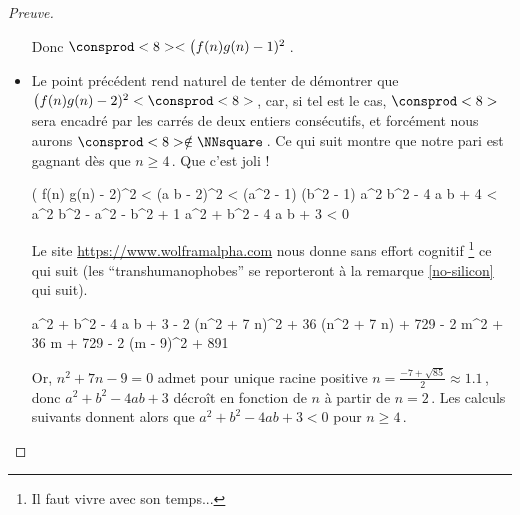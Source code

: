 \begin{proof}[Preuve]
\begin{itemize}
        \medskip
        
        \noindent
        Donc $\consprod<8> < \big( f(n) g(n) - 1)^2$\,.


		\item Le point précédent rend naturel de tenter de démontrer que 
		$\big( f(n) g(n) - 2)^2 < \consprod<8>$\,, car, si tel est le cas, 
		$\consprod<8>$ sera encadré par les carrés de deux entiers consécutifs, et forcément nous aurons $\consprod<8> \notin \NNsquare$\,. 
		Ce qui suit montre que notre pari est gagnant dès que $n \geq 4$\,. Que c'est joli !

        \medskip
        \noindent\kern-6pt%
        \begin{stepcalc}[style = ar*, ope={\iff}]
        	\big( f(n) g(n) - 2)^2 < \consprod<8>
        	(a b - 2)^2 < (a^2 - 1) (b^2 - 1)
        \explnext{}
        	a^2 b^2 - 4 a b + 4 < a^2 b^2 - a^2 - b^2 + 1
        \explnext{}
        	a^2 + b^2 - 4 a b + 3 < 0
        \end{stepcalc}

        \medskip
        \noindent
        Le site \url{https://www.wolframalpha.com} nous donne sans effort cognitif
        \footnote{
        	Il faut vivre avec son temps...
        }
        ce qui suit (les \enquote{transhumanophobes} se reporteront à la remarque \ref{no-silicon} qui suit).

        \medskip
        \noindent\kern-6pt%
        \begin{stepcalc}[style = ar*, ope={=}]
        	a^2 + b^2 - 4 a b + 3
        \explnext{}
        	- 2 (n^2 + 7 n)^2 + 36 (n^2 + 7 n) + 729
        	- 2 m^2 + 36 m + 729
        \explnext{}
        	- 2 (m - 9)^2 + 891
        \end{stepcalc}
        
        \medskip
        
        \noindent
        Or, $n^2 + 7 n - 9 = 0$ admet pour unique racine positive $n = \frac{- 7 + \sqrt{85}}{2} \approx \num{1.1}$\,,
        donc $a^2 + b^2 - 4 a b + 3$ décroît en fonction de $n$ à partir de $n = 2$\,. Les calculs suivants donnent alors que $a^2 + b^2 - 4 a b + 3 < 0$ pour $n \geq 4$\,.
	\end{itemize}

	\begin{center}
	\end{center}


\end{proof}
